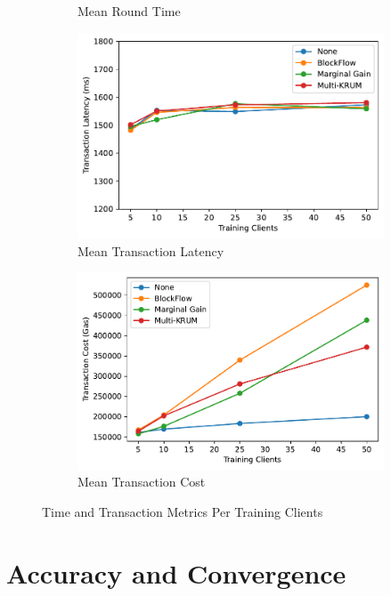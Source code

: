 \begin{figure}[!ht]
\begin{subfigure}[b]{0.49\textwidth}
        \caption{Mean Round Time}
    \end{subfigure}
    \hfill
    \begin{subfigure}[b]{0.49\textwidth}
        \centering
        \includegraphics[width=\textwidth]{graphics/clients/tx_latency.pdf}
        \caption{Mean Transaction Latency}
    \end{subfigure}
    \hfill
    \begin{subfigure}[b]{0.49\textwidth}
        \centering
        \includegraphics[width=\textwidth]{graphics/clients/tx_cost.pdf}
        \caption{Mean Transaction Cost}
    \end{subfigure}
    \caption{Time and Transaction Metrics Per Training Clients}
    \label{fig:clients_metrics}
\end{figure}

\section{Accuracy and Convergence}

